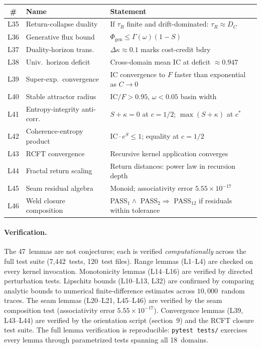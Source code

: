 \documentclass[
  aps,
  prd,
  twocolumn,
  superscriptaddress,
  nofootinbib,
  floatfix
]{revtex4-2}
\newcommand{\tR}{\tau_{\!R}}
\newcommand{\Gam}{\Gamma}
\newcommand{\IC}{\mathrm{IC}}
\begin{document}
\begin{center}
{\small\begin{tabular}{@{}clp{3.7cm}@{}}
\toprule
\textbf{\#} & \textbf{Name} & \textbf{Statement} \\
\midrule
L35 & Return-collapse duality & If $\tR$ finite and drift-dominated: $\tR \approx D_C$ \\
L36 & Generative flux bound & $\Phi_\mathrm{gen} \leq \Gam(\omega)(1{-}S)$ \\
L37 & Duality-horizon trans.\ & $\Delta\kappa \approx 0.1$ marks cost-credit bdry \\
L38 & Univ.\ horizon deficit & Cross-domain mean $\IC$ at deficit $\approx 0.947$ \\
L39 & Super-exp.\ convergence & IC convergence to $F$ faster than exponential as $C \to 0$ \\
L40 & Stable attractor radius & $\IC/F > 0.95$, $\omega < 0.05$ basin width \\
L41 & Entropy-integrity anti-corr.\ & $S + \kappa = 0$ at $c = 1/2$; $\max(S{+}\kappa)$ at $c^*$ \\
L42 & Coherence-entropy product & $\IC \cdot e^S \leq 1$; equality at $c = 1/2$ \\
L43 & RCFT convergence & Recursive kernel application converges \\
L44 & Fractal return scaling & Return distances: power law in recursion depth \\
L45 & Seam residual algebra & Monoid; associativity error $5.55 \times 10^{-17}$ \\
L46 & Weld closure composition & PASS$_1 \wedge$ PASS$_2 \Rightarrow$ PASS$_{12}$ if residuals within tolerance \\
\bottomrule
\end{tabular}}
\end{center}

\paragraph{Verification.}
The 47~lemmas are not conjectures; each is verified
\emph{computationally} across the full test suite
(7{,}442~tests, 120~test files).  Range lemmas (L1--L4)
are checked on every kernel invocation.  Monotonicity lemmas
(L14--L16) are verified by directed perturbation tests.
Lipschitz bounds (L10--L13, L32) are confirmed by comparing
analytic bounds to numerical finite-difference estimates
across $10{,}000$~random traces.  The seam lemmas
(L20--L21, L45--L46) are verified by the seam composition
test (associativity error $5.55 \times 10^{-17}$).
Convergence lemmas (L39, L43--L44) are verified by the
orientation script (section~9) and the RCFT closure test
suite.  The full lemma verification is reproducible:
\texttt{pytest tests/} exercises every lemma through
parametrized tests spanning all 18~domains.
\end{document}
